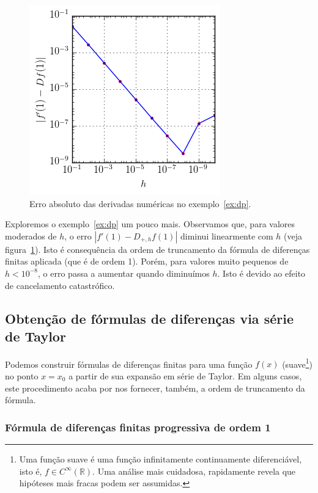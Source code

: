 \begin{figure}
  \centering
  \includegraphics{./cap_derivacao/pics/ex_derivacao/ex_derivacao}
  \caption{Erro absoluto das derivadas numéricas no exemplo~\ref{ex:dp}.}
  \label{fig:ex_derivacao}
\end{figure}

Exploremos o exemplo~\ref{ex:dp} um pouco mais. Observamos que, para valores moderados de $h$, o erro $|f'(1)-D_{+,h}f(1)|$ diminui linearmente com $h$ (veja figura~\ref{fig:ex_derivacao}). Isto é consequência da ordem de truncamento da fórmula de diferenças finitas aplicada (que é de ordem 1). Porém, para valores muito pequenos de $h < 10^{-8}$, o erro passa a aumentar quando diminuímos $h$. Isto é devido ao efeito de cancelamento catastrófico.

\subsection{Obtenção de fórmulas de diferenças via série de Taylor}

Podemos construir fórmulas de diferenças finitas para uma função $f(x)$ (suave\footnote{Uma função suave é uma função infinitamente continuamente diferenciável, isto é, $f\in C^\infty(\mathbb{R})$. Uma análise mais cuidadosa, rapidamente revela que hipóteses mais fracas podem ser assumidas.}) no ponto $x = x_0$ a partir de sua expansão em série de Taylor. Em alguns casos, este procedimento acaba por nos fornecer, também, a ordem de truncamento da fórmula.

\subsubsection{Fórmula de diferenças finitas progressiva de ordem 1}

